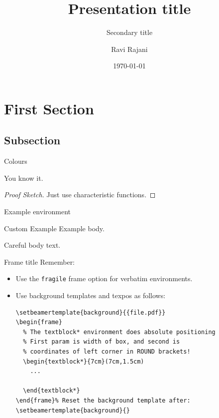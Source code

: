 \documentclass[notes=onslide]{slides} %
\title
{Presentation title}
\subtitle
{Secondary title}
\author
{Ravi Rajani}
\institute
{Department of Mathematics}
\date{\today}
\begin{document}
\begin{frame}
  \titlepage
\end{frame}


\section{First Section}

\subsection{Subsection}

\begin{frame}{Colours}
\begin{theorem}
You know it. 
\end{theorem}
\begin{proof}[Proof Sketch]
Just use characteristic functions.
\end{proof}
\begin{example}
Example environment
\end{example}
\begin{minipage}{.5\textwidth}
  \begin{exampleblock}{Custom Example}
    Example body.
    \end{exampleblock}
\end{minipage}
\begin{alertblock}{Careful}
  body text.
\end{alertblock}
\end{frame}

\begin{frame}[fragile]{Frame title}
    Remember:
    \begin{itemize}[<+->]
      \item Use the \texttt{fragile} frame option for \textcolor<2->{OUMidBlue}{verbatim} environments.
      \item Use \colorbox{OUYellow}{background templates} and \alert{texpos} as follows:
            \begin{verbatim}
\setbeamertemplate{background}{{file.pdf}}
\begin{frame}
  % The textblock* environment does absolute positioning
  % First param is width of box, and second is
  % coordinates of left corner in ROUND brackets!
  \begin{textblock*}{7cm}(7cm,1.5cm)
    ...
    
  \end{textblock*}
\end{frame}% Reset the background template after:
\setbeamertemplate{background}{}
\end{verbatim}
    \end{itemize}
\end{frame}
\end{document}

